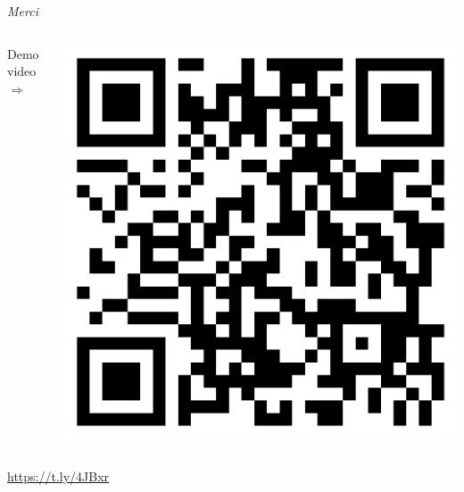 

\section*{\phantom{Thanks}}

\begin{frame}{}

  \vspace{6ex}

  \centering
  {
    \Huge
    \emph{Merci}
  }

  \vspace{6ex}

  \begin{columns}

    \hspace{-27ex}

    \begin{column}{0.5\textwidth}
      \raggedleft
      {\Large Demo video $\Longrightarrow$}
    \end{column}

    \hspace{-12ex}

    \begin{column}{0.5\textwidth}
      \includegraphics[width=0.5\linewidth]{figures/demo_qr_code.png}
    \end{column}

  \end{columns}

  \vspace{3ex}

  \centering
  {\Large
    \url{https://t.ly/4JBxr}
  }

\end{frame}
